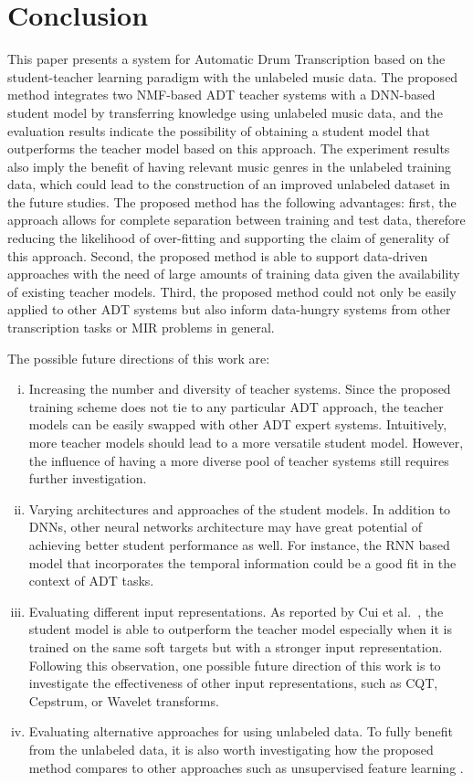 \documentclass{article}
\begin{document}
\section{Conclusion}\label{sec:conclusion}
This paper presents a system for Automatic Drum Transcription based on the student-teacher learning paradigm with the unlabeled music data. The proposed method integrates two NMF-based ADT teacher systems with a DNN-based student model by transferring knowledge using unlabeled music data, and the evaluation results indicate the possibility of obtaining a student model that outperforms the teacher model based on this approach. The experiment results also imply the benefit of having relevant music genres in the unlabeled training data, which could lead to the construction of an improved unlabeled dataset in the future studies. The proposed method has the following advantages: first, the approach allows for complete separation between training and test data, therefore reducing the likelihood of over-fitting and supporting the claim of generality of this approach. Second, the proposed method is able to support data-driven approaches with the need of large amounts of training data given the availability of existing teacher models. Third, the proposed method could not only be easily applied to other ADT systems but also inform data-hungry systems from other transcription tasks or MIR problems in general.

The possible future directions of this work are:
\begin{enumerate}[(i)]
    \item   Increasing the number and diversity of teacher systems. Since the proposed training scheme does not tie to any particular ADT approach, the teacher models can be easily swapped with other ADT expert systems. Intuitively, more teacher models should lead to a more versatile student model. However, the influence of having a more diverse pool of teacher systems still requires further investigation. 
    \item   Varying architectures and approaches of the student models. In addition to DNNs, other neural networks architecture may have great potential of achieving better student performance as well. For instance, the RNN based model that incorporates the temporal information could be a good fit in the context of ADT tasks. 
    \item   Evaluating different input representations. As reported by Cui et al.~\cite{Cui2017}, the student model is able to outperform the teacher model especially when it is trained on the same soft targets but with a stronger input representation. Following this observation, one possible future direction of this work is to investigate the effectiveness of other input representations, such as CQT, Cepstrum, or Wavelet transforms. 
    \item   Evaluating alternative approaches for using unlabeled data. To fully benefit from the unlabeled data, it is also worth investigating how the proposed method compares to other approaches such as unsupervised feature learning \cite{Raina2007a}. 
\end{enumerate}
\end{document}
